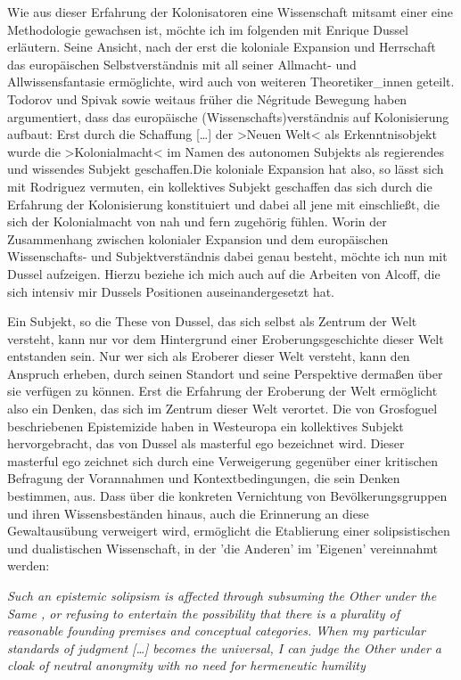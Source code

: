 Wie aus dieser Erfahrung der Kolonisatoren eine Wissenschaft mitsamt einer eine
Methodologie gewachsen ist, möchte ich im folgenden mit Enrique Dussel
erläutern. Seine Ansicht, nach der erst die koloniale Expansion und Herrschaft
das europäischen Selbstverständnis mit all seiner Allmacht- und
Allwissensfantasie ermöglichte, wird auch von weiteren Theoretiker\_innen
geteilt. Todorov und Spivak sowie weitaus früher die Négritude Bewegung haben
argumentiert, dass das europäische (Wissenschafts)verständnis auf Kolonisierung
aufbaut: Erst durch die \glqq Schaffung […] der >Neuen Welt< als
Erkenntnisobjekt wurde die >Kolonialmacht< im Namen des autonomen Subjekts als
regierendes und wissendes Subjekt geschaffen.\grqq Die koloniale Expansion
hat also, so lässt sich mit Rodriguez vermuten, ein kollektives Subjekt
geschaffen das sich durch die Erfahrung der Kolonisierung konstituiert und
dabei all jene mit einschließt, die sich der Kolonialmacht von nah und fern
zugehörig fühlen.  Worin der Zusammenhang zwischen kolonialer Expansion und dem
europäischen Wissenschafts- und Subjektverständnis dabei genau besteht, möchte
ich nun mit Dussel aufzeigen. Hierzu beziehe ich mich auch auf die Arbeiten von
Alcoff, die sich intensiv mir Dussels Positionen auseinandergesetzt hat. 

Ein Subjekt, so die These von Dussel, das sich selbst als Zentrum der Welt
versteht, kann nur vor dem Hintergrund einer Eroberungsgeschichte dieser Welt
entstanden sein. Nur wer sich als Eroberer dieser Welt versteht, kann den
Anspruch erheben, durch seinen Standort und seine Perspektive dermaßen über sie
verfügen zu können. Erst die Erfahrung der Eroberung der Welt ermöglicht also
ein Denken, das sich im Zentrum dieser Welt verortet. Die von Grosfoguel
beschriebenen Epistemizide haben in Westeuropa ein kollektives Subjekt
hervorgebracht, das von Dussel als \glqq masterful ego \grqq \footnotemark
{} bezeichnet wird. Dieser
\glqq masterful ego \grqq zeichnet sich durch eine Verweigerung gegenüber einer
kritischen Befragung der Vorannahmen und Kontextbedingungen, die sein Denken
bestimmen, aus. Dass über die konkreten Vernichtung von Bevölkerungsgruppen und
ihren Wissensbeständen hinaus, auch die Erinnerung an diese Gewaltausübung
verweigert wird, ermöglicht die Etablierung einer solipsistischen und
dualistischen Wissenschaft, in der 'die Anderen' im 'Eigenen' vereinnahmt
werden:
\begin{myenv} 
  \textit{\glqq Such an epistemic solipsism is affected through
    subsuming  \glqq the Other under the Same \grqq, or refusing to entertain the
    possibility that there is a plurality of reasonable founding premises and
    conceptual categories. When my particular standards of judgment […] becomes
    the universal, I can judge the Other under a cloak of neutral anonymity
    with no need for hermeneutic humility
    \grqq \footnotemark {}
 }
\end{myenv}

